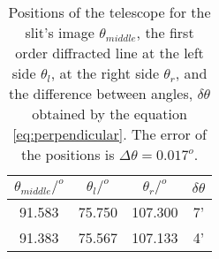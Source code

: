 \begin{table}[H]
	\centering
	\begin{tabular}{ c  c  c  c }
		\\\hline
		\centering
			$\theta_{middle}/^o$ & $\theta_{l}/^o$ & $\theta_{r}/^o$ & $\delta\theta$ \\\hline
			91.583 & 75.750 & 107.300 & 7' \\
			91.383 & 75.567 & 107.133 & 4' \\\hline
	\end{tabular}
	\caption{\label{Tab:Perpendicular}Positions of the telescope for the slit's image $\theta_{middle}$, the first order diffracted \cl line at the left side $\theta_{l}$, at the right side $\theta_{r}$, and the difference between angles, $\delta \theta$ obtained by the equation \ref{eq:perpendicular}. The error of the positions is $\Delta \theta = 0.017 ^o$.}
\end{table}
